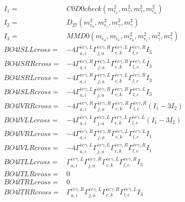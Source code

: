 \documentclass[A4,landscape]{article}
\begin{document}
\begin{align} 
I_1 = & C0D0check(m^2_{e_{{c}}}, m^2_{\gamma}, m^2_{\gamma}, m^2_{e_{{a}}}) \\ 
I_2 = & D_{27}(m^2_{e_{{a}}}, m^2_{e_{{c}}}, m^2_{\gamma}, m^2_{\gamma}) \\ 
I_3 = & MMD0(m_{e_{{a}}}, m_{e_{{c}}}, m^2_{e_{{a}}}, m^2_{e_{{c}}}, m^2_{\gamma}, m^2_{\gamma}) \\ 
  BO4lSLLcross= & -4  \Gamma^{\bar{e}e \gamma ,L}_{a, i} \Gamma^{\bar{e}e \gamma ,R}_{j, a} \Gamma^{\bar{e}e \gamma ,L}_{c, k} \Gamma^{\bar{e}e \gamma ,R}_{l, c} I_3 \\ 
  BO4lSRRcross= & -4  \Gamma^{\bar{e}e \gamma ,R}_{a, i} \Gamma^{\bar{e}e \gamma ,L}_{j, a} \Gamma^{\bar{e}e \gamma ,R}_{c, k} \Gamma^{\bar{e}e \gamma ,L}_{l, c} I_3 \\ 
  BO4lSRLcross= & -4  \Gamma^{\bar{e}e \gamma ,R}_{a, i} \Gamma^{\bar{e}e \gamma ,L}_{j, a} \Gamma^{\bar{e}e \gamma ,L}_{c, k} \Gamma^{\bar{e}e \gamma ,R}_{l, c} I_3 \\ 
  BO4lSLRcross= & -4  \Gamma^{\bar{e}e \gamma ,L}_{a, i} \Gamma^{\bar{e}e \gamma ,R}_{j, a} \Gamma^{\bar{e}e \gamma ,R}_{c, k} \Gamma^{\bar{e}e \gamma ,L}_{l, c} I_3 \\ 
  BO4lVRRcross= & -4  \Gamma^{\bar{e}e \gamma ,R}_{a, i} \Gamma^{\bar{e}e \gamma ,R}_{j, a} \Gamma^{\bar{e}e \gamma ,R}_{c, k} \Gamma^{\bar{e}e \gamma ,R}_{l, c} (I_1 - 3 I_2) \\ 
  BO4lVLLcross= & -4  \Gamma^{\bar{e}e \gamma ,L}_{a, i} \Gamma^{\bar{e}e \gamma ,L}_{j, a} \Gamma^{\bar{e}e \gamma ,L}_{c, k} \Gamma^{\bar{e}e \gamma ,L}_{l, c} (I_1 - 3 I_2) \\ 
  BO4lVRLcross= & -4  \Gamma^{\bar{e}e \gamma ,R}_{a, i} \Gamma^{\bar{e}e \gamma ,R}_{j, a} \Gamma^{\bar{e}e \gamma ,L}_{c, k} \Gamma^{\bar{e}e \gamma ,L}_{l, c} I_1 \\ 
  BO4lVLRcross= & -4  \Gamma^{\bar{e}e \gamma ,L}_{a, i} \Gamma^{\bar{e}e \gamma ,L}_{j, a} \Gamma^{\bar{e}e \gamma ,R}_{c, k} \Gamma^{\bar{e}e \gamma ,R}_{l, c} I_1 \\ 
  BO4lTLLcross= &  \Gamma^{\bar{e}e \gamma ,L}_{a, i} \Gamma^{\bar{e}e \gamma ,R}_{j, a} \Gamma^{\bar{e}e \gamma ,L}_{c, k} \Gamma^{\bar{e}e \gamma ,R}_{l, c} I_3 \\ 
  BO4lTLRcross= & 0 \\ 
  BO4lTRLcross= & 0 \\ 
  BO4lTRRcross= &  \Gamma^{\bar{e}e \gamma ,R}_{a, i} \Gamma^{\bar{e}e \gamma ,L}_{j, a} \Gamma^{\bar{e}e \gamma ,R}_{c, k} \Gamma^{\bar{e}e \gamma ,L}_{l, c} I_3 \\ 
\end{align} 
\end{document}
